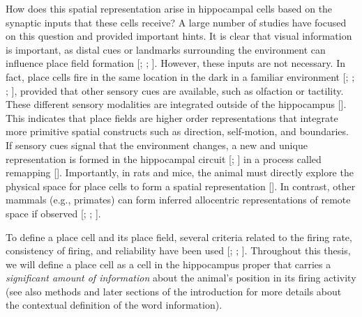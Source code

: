 How does this spatial representation arise in hippocampal cells based on the synaptic inputs that these cells receive? A large number of studies have focused on this question and provided important hints.
It is clear that visual information is important, as distal cues or landmarks surrounding the environment can influence place field formation [\cite{mullerkubie1987}; \cite{okeefe1978}; \cite{yoganarasimha2005}]. However, these inputs are not necessary. 
In fact, place cells fire in the same location in the dark in a familiar environment [\cite{save2000}; \cite{zhang2014}; \cite{markus1994}; \cite{quirk1990}], provided that other sensory cues are available, such as olfaction or tactility. 
These different sensory modalities are integrated outside of the hippocampus [\cite{jeffery2007}]. 
This indicates that place fields are higher order representations that integrate more primitive spatial constructs such as direction, self-motion, and boundaries. 
If sensory cues signal that the environment changes, a new and unique representation is formed in the hippocampal circuit [\cite{anderson2003}; \cite{okeefe1978}] in a process called remapping [\cite{mullerkubie1987}]. 
Importantly, in rats and mice, the animal must directly explore the physical space for place cells to form a spatial representation [\cite{rowland2011}]. 
In contrast, other mammals (e.g., primates) can form inferred allocentric representations of remote space if observed [\cite{rolls1999}; \cite{rolls1997}; \cite{rolls1995}]. 

To define a place cell and its place field, several criteria related to the firing rate, consistency of firing, and reliability have been used [\cite{okeefe1976}; \cite{thompson1990}; \cite{dombeck2010}]. 
Throughout this thesis, we will define a place cell as a cell in the hippocampus proper that carries a \textit{significant amount of information} about the animal's position in its firing activity (see also methods and later sections of the introduction for more details about the contextual definition of the word information).  

